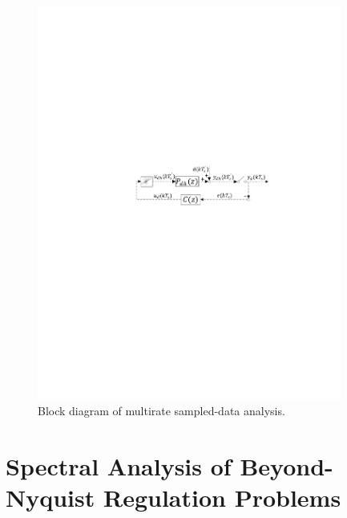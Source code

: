 \documentclass [11pt, proquest] {uwthesis}[2020/02/24]
\begin{document}
\begin{figure}[!ht]
\begin{centering}
\includegraphics[width=10cm]{Spectral-analysis/FIG2.pdf}
\par\end{centering}
\caption{\label{fig:Block-diagramPCH-with}Block diagram of multirate sampled-data
analysis.}
\end{figure}

\section{\label{sec:Main-results}Spectral Analysis of Beyond-Nyquist Regulation
Problems}
\end{document}
